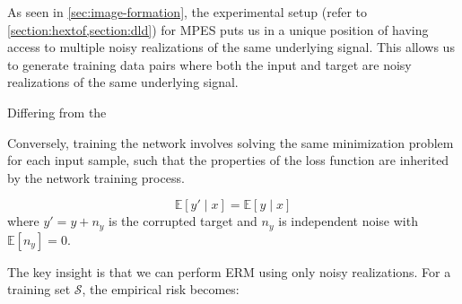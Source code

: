 As seen in \cref{sec:image-formation}, the experimental setup (refer to \cref{section:hextof,section:dld}) for \gls{MPES} puts us in a unique position of having access to multiple noisy realizations of the same underlying signal. This allows us to generate training data pairs where both the input and target are noisy realizations of the same underlying signal.



Differing from the 





Conversely, training the network involves solving the same minimization problem for each input sample, such that the properties of the loss function are inherited by the network training process.


\begin{equation}
    \mathbb{E}[y{\prime} \mid x] = \mathbb{E}[y \mid x]
\end{equation}
where $y{\prime} = y + n_y$ is the corrupted target and $n_y$ is independent noise with $\mathbb{E}[n_y] = 0$.

The key insight is that we can perform \gls{ERM} using only noisy realizations. For a training set $\mathcal{S}$, the empirical risk becomes:


